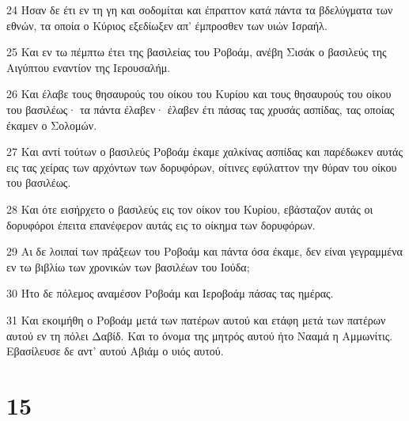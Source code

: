 \par 24 Ήσαν δε έτι εν τη γη και σοδομίται και έπραττον κατά πάντα τα βδελύγματα των εθνών, τα οποία ο Κύριος εξεδίωξεν απ' έμπροσθεν των υιών Ισραήλ.
\par 25 Και εν τω πέμπτω έτει της βασιλείας του Ροβοάμ, ανέβη Σισάκ ο βασιλεύς της Αιγύπτου εναντίον της Ιερουσαλήμ.
\par 26 Και έλαβε τους θησαυρούς του οίκου του Κυρίου και τους θησαυρούς του οίκου του βασιλέως· τα πάντα έλαβεν· έλαβεν έτι πάσας τας χρυσάς ασπίδας, τας οποίας έκαμεν ο Σολομών.
\par 27 Και αντί τούτων ο βασιλεύς Ροβοάμ έκαμε χαλκίνας ασπίδας και παρέδωκεν αυτάς εις τας χείρας των αρχόντων των δορυφόρων, οίτινες εφύλαττον την θύραν του οίκου του βασιλέως.
\par 28 Και ότε εισήρχετο ο βασιλεύς εις τον οίκον του Κυρίου, εβάσταζον αυτάς οι δορυφόροι έπειτα επανέφερον αυτάς εις το οίκημα των δορυφόρων.
\par 29 Αι δε λοιπαί των πράξεων του Ροβοάμ και πάντα όσα έκαμε, δεν είναι γεγραμμένα εν τω βιβλίω των χρονικών των βασιλέων του Ιούδα;
\par 30 Ήτο δε πόλεμος αναμέσον Ροβοάμ και Ιεροβοάμ πάσας τας ημέρας.
\par 31 Και εκοιμήθη ο Ροβοάμ μετά των πατέρων αυτού και ετάφη μετά των πατέρων αυτού εν τη πόλει Δαβίδ. Και το όνομα της μητρός αυτού ήτο Νααμά η Αμμωνίτις. Εβασίλευσε δε αντ' αυτού Αβιάμ ο υιός αυτού.

\chapter{15}

